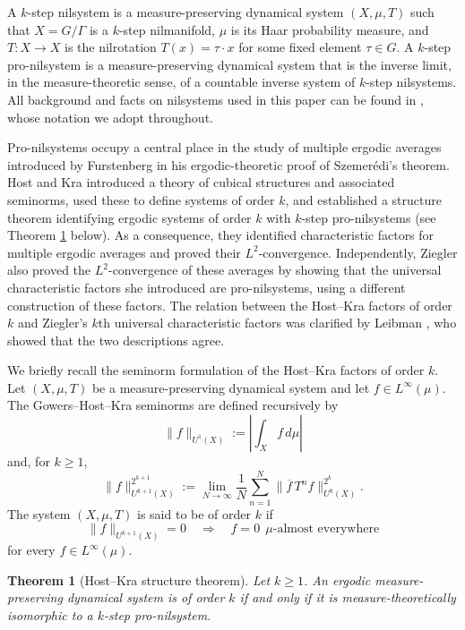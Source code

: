 \documentclass[12pt]{amsart}
\theoremstyle{plain}
\newtheorem{theorem}{Theorem}[section]
\theoremstyle{definition}
\begin{document}
A $k$-step nilsystem is a measure-preserving dynamical system $(X,\mu,T)$ such that
$X = G/\Gamma$ is a $k$-step nilmanifold, $\mu$ is its Haar probability measure, and
$T \colon X \to X$ is the nilrotation $T(x) = \tau \cdot x$ for some fixed element $\tau \in G$.
A $k$-step pro-nilsystem is a measure-preserving dynamical system that is the inverse
limit, in the measure-theoretic sense, of a countable inverse system of $k$-step
nilsystems. All background and facts on nilsystems used in
this paper can be found in \cite[Part~3]{hk-book}, whose notation we adopt throughout.


Pro-nilsystems occupy a central place in the study of multiple ergodic
averages introduced by
Furstenberg \cite{furstenberg1977ergodic} in his ergodic-theoretic proof of
Szemer\'edi's theorem. 
Host and Kra \cite{host2005nonconventional} introduced a theory of cubical
structures and associated seminorms, used these to define systems of order $k$,
and established a structure theorem identifying ergodic systems of order $k$
with $k$-step pro-nilsystems (see Theorem \ref{hkz-thm} below). As a consequence, they identified
characteristic factors for multiple ergodic averages and proved their $L^2$-convergence. 
Independently, Ziegler \cite{ziegler2007universal} also proved the
$L^2$-convergence of these averages by showing that the universal
characteristic factors she introduced are pro-nilsystems, using a
different construction of these factors. The relation
between the Host--Kra factors of order $k$ and Ziegler's $k$th universal characteristic factors was clarified by Leibman
\cite{leibman-factor}, who showed that the two descriptions agree.

We briefly recall the seminorm formulation of the Host--Kra factors of order $k$. Let
$(X,\mu,T)$ be a measure-preserving dynamical system and let $f \in L^\infty(\mu)$. The
Gowers--Host--Kra seminorms are defined recursively by
\[
\|f\|_{U^1(X)} := \left| \int_X f\,d\mu \right|
\]
and, for $k \geq 1$,
\[
\|f\|_{U^{k+1}(X)}^{2^{k+1}}
:=
\lim_{N\to\infty} \frac{1}{N}\sum_{n=1}^N
\bigl\| \overline{f}\, T^n f \bigr\|_{U^k(X)}^{2^k}.
\]
The system $(X,\mu,T)$ is said to be of order $k$ if
\[
\|f\|_{U^{k+1}(X)} = 0
\quad\Longrightarrow\quad
f=0 \ \ \mu\text{-almost everywhere}
\]
for every $f \in L^\infty(\mu)$.

\begin{theorem}[Host--Kra structure theorem]\label{hkz-thm}
Let $k \geq 1$. An ergodic measure-preserving dynamical system is of order $k$
if and only if it is measure-theoretically isomorphic to a $k$-step
pro-nilsystem.
\end{theorem}
\end{document}
